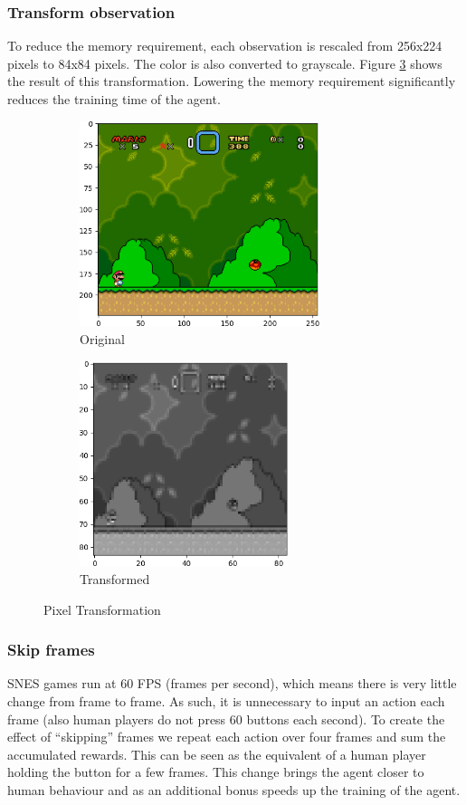 \documentclass{article}
\begin{document}
    \subsubsection{Transform observation}
    To reduce the memory requirement, each observation is rescaled from 256x224 pixels to 84x84 pixels.
    The color is also converted to grayscale.
    Figure \ref{fig:transformation} shows the result of this transformation.
    Lowering the memory requirement significantly reduces the training time of the agent.
    \begin{figure}[H]
        \centering
        \begin{subfigure}{.5\textwidth}
            \centering
            \includegraphics[height=6cm]{original_crop}
            \caption{Original}
            \label{fig:sub1}
        \end{subfigure}%
        \begin{subfigure}{.5\textwidth}
            \centering
            \includegraphics[height=6cm]{grayscale_crop}
            \caption{Transformed}
            \label{fig:sub2}
        \end{subfigure}
        \caption{Pixel Transformation}
        \label{fig:transformation}
    \end{figure}
    \subsubsection{Skip frames}
    SNES games run at 60 FPS (frames per second), which means there is very little change from frame to frame.
    As such, it is unnecessary to input an action each frame (also human players do not press 60 buttons each second).
    To create the effect of ``skipping'' frames we repeat each action over four frames and sum the accumulated rewards.
    This can be seen as the equivalent of a human player holding the button for a few frames.
    This change brings the agent closer to human behaviour and as an additional bonus speeds up the training of the agent.
\end{document}
